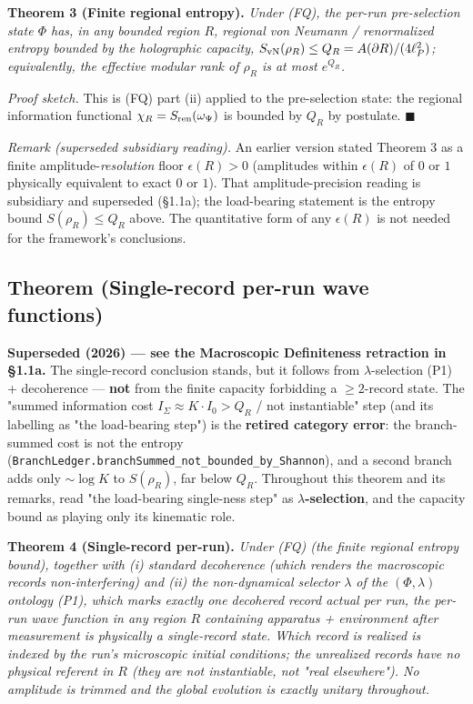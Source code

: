 \documentclass[11pt,a4paper]{article}
\newenvironment{qiqtquote}{\begin{mdframed}[style=quotestyle]}{\end{mdframed}}
\begin{document}
\textbf{Theorem 3 (Finite regional entropy).} \emph{Under (FQ), the per-run pre-selection state $\Phi$ has, in any bounded region $R$, regional von Neumann / renormalized entropy bounded by the holographic capacity, $S_{\rm vN}(\rho_R) \le Q_R = A(\partial R)/(4\ell_P^2)$; equivalently, the effective modular rank of $\rho_R$ is at most $e^{Q_R}$.}

\emph{Proof sketch.} This is (FQ) part (ii) applied to the pre-selection state: the regional information functional $\chi_R = S_{\rm ren}(\omega_\Psi)$ is bounded by $Q_R$ by postulate. $\blacksquare$

\emph{Remark (superseded subsidiary reading).} An earlier version stated Theorem 3 as a finite amplitude-\emph{resolution} floor $\epsilon(R) > 0$ (amplitudes within $\epsilon(R)$ of $0$ or $1$ physically equivalent to exact $0$ or $1$). That amplitude-precision reading is subsidiary and superseded (§1.1a); the load-bearing statement is the entropy bound $S(\rho_R) \le Q_R$ above. The quantitative form of any $\epsilon(R)$ is not needed for the framework's conclusions.

\subsection{Theorem (Single-record per-run wave functions)}

\begin{qiqtquote}
\textbf{Superseded (2026) — see the Macroscopic Definiteness retraction in §1.1a.} The single-record conclusion stands, but it follows from $\lambda$-selection (P1) + decoherence — \textbf{not} from the finite capacity forbidding a $\ge 2$-record state. The "summed information cost $I_\Sigma \approx K\cdot I_0 > Q_R$ / not instantiable" step (and its labelling as "the load-bearing step") is the \textbf{retired category error}: the branch-summed cost is not the entropy (\texttt{BranchLedger.branchSummed\_not\_bounded\_by\_Shannon}), and a second branch adds only $\sim\!\log K$ to $S(\rho_R)$, far below $Q_R$. Throughout this theorem and its remarks, read "the load-bearing single-ness step" as \textbf{$\lambda$-selection}, and the capacity bound as playing only its kinematic role.
\end{qiqtquote}

\textbf{Theorem 4 (Single-record per-run).} \emph{Under (FQ) (the finite regional entropy bound), together with (i) standard decoherence (which renders the macroscopic records non-interfering) and (ii) the non-dynamical selector $\lambda$ of the $(\Phi,\lambda)$ ontology (P1), which marks exactly one decohered record actual per run, the per-run wave function in any region $R$ containing apparatus + environment after measurement is physically a single-record state. Which record is realized is indexed by the run's microscopic initial conditions; the unrealized records have no physical referent in $R$ (they are not instantiable, not "real elsewhere"). No amplitude is trimmed and the global evolution is exactly unitary throughout.}
\end{document}
